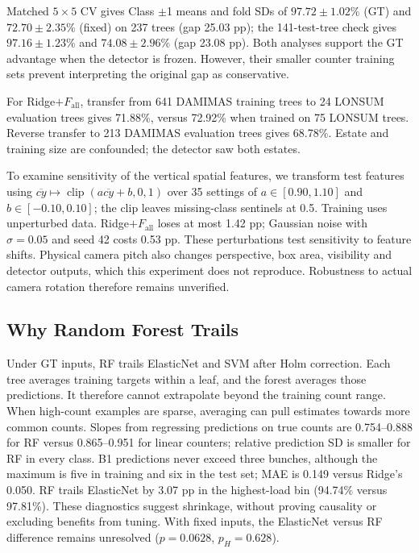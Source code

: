 \documentclass[conference,a4paper]{IEEEtran}
\begin{document}
Matched $5\times5$ CV gives Class $\pm$1 means and fold SDs of
$97.72\pm1.02$\% (GT) and $72.70\pm2.35$\% (fixed) on 237 trees
(gap 25.03 pp); the 141-test-tree check gives $97.16\pm1.23$\% and
$74.08\pm2.96$\% (gap 23.08 pp). Both analyses support the GT advantage when the detector is frozen. However,
their smaller counter training sets prevent interpreting the original gap as
conservative.

For Ridge$+F_{\text{all}}$, transfer
from 641 DAMIMAS training trees to 24 LONSUM evaluation trees gives 71.88\%,
versus 72.92\% when trained on 75 LONSUM trees. Reverse transfer to 213
DAMIMAS evaluation trees gives 68.78\%. Estate and training size are confounded;
the detector saw both estates.

To examine sensitivity of the vertical spatial features, we transform test
features using $\overline{cy}\mapsto\operatorname{clip}
(a\overline{cy}+b,0,1)$ over 35 settings of $a\in[0.90,1.10]$ and
$b\in[-0.10,0.10]$; the clip leaves missing-class sentinels at 0.5. Training
uses unperturbed data.
Ridge$+F_{\text{all}}$ loses at most 1.42 pp; Gaussian noise with
$\sigma=0.05$ and seed 42 costs 0.53 pp. These perturbations test sensitivity to feature shifts. Physical camera pitch
also changes perspective, box area, visibility and detector outputs, which
this experiment does not reproduce. Robustness to actual camera rotation
therefore remains unverified.

\subsection{Why Random Forest Trails}
\label{sec:rf}
Under GT inputs, RF trails ElasticNet and SVM after Holm correction. Each tree
averages training targets within a leaf, and the forest averages those predictions.
It therefore cannot extrapolate beyond the training count range. When high-count
examples are sparse, averaging can pull estimates towards more common counts.
Slopes from regressing predictions on true counts are
0.754--0.888 for RF versus 0.865--0.951 for linear counters; relative prediction
SD is smaller for RF in every class. B1 predictions never exceed three bunches,
although the maximum is five in training and six in the test set; MAE is 0.149
versus Ridge's 0.050.
RF trails ElasticNet by 3.07 pp in the highest-load bin (94.74\% versus 97.81\%).
These diagnostics suggest shrinkage, without proving causality or excluding
benefits from tuning. With fixed inputs, the ElasticNet versus RF difference remains unresolved
($p=0.0628$, $p_H=0.628$).
\end{document}
